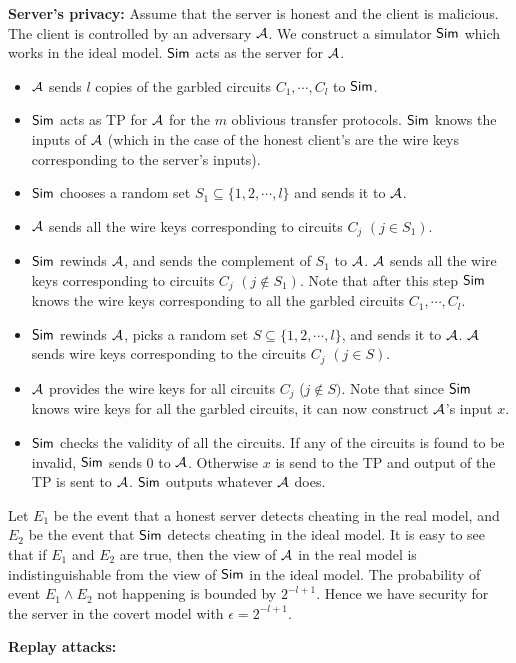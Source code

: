 \documentclass[12pt]{article}
\begin{document}
\noindent
{\bf Server's privacy:} Assume that the server is honest and the
client is malicious. The client is controlled by an
adversary ${\cal A}$. We construct a simulator ${\sf Sim}$ which works
in the ideal model. ${\sf Sim}$ acts as the server for ${\cal A}$.
\begin{itemize}
\item ${\cal A}$ sends $l$ copies of the garbled circuits $C_1,\cdots,C_l$ to ${\sf Sim}$.
\item ${\sf Sim}$ acts as TP for ${\cal A}$ for the $m$ oblivious transfer protocols. ${\sf Sim}$ knows the
inputs of ${\cal A}$ (which in the case of the honest client's are the wire keys corresponding to the 
server's inputs).
\item ${\sf Sim}$ chooses a random set $S_1 \subseteq \{ 1,2, \cdots, l \}$ and sends it to ${\cal A}$.

\item ${\cal A}$ sends all the wire keys corresponding to circuits $C_j$ $(j \in S_1)$.

\item ${\sf Sim}$ rewinds ${\cal A}$, and sends the complement of $S_1$ to ${\cal A}$. 
${\cal A}$ sends all the wire keys corresponding to circuits $C_j$ $(j \not\in S_1)$. Note that after this
step ${\sf Sim}$ knows the wire keys corresponding to all the garbled circuits $C_1,\cdots,C_l$.

\item ${\sf Sim}$ rewinds ${\cal A}$, picks a random set $S \subseteq \{ 1,2,\cdots, l \}$, and
sends it to ${\cal A}$. ${\cal A}$ sends wire keys corresponding to the circuits $C_j$ $(j \in S)$. 

\item ${\cal A}$ provides the wire keys for all circuits $C_j$ ($j \not\in S)$. Note that since ${\sf Sim}$
knows wire keys for all the garbled circuits, it can now construct ${\cal A}$'s input $x$.

\item ${\sf Sim}$ checks the validity of all the circuits. If any of the circuits is found to be invalid,
${\sf Sim}$ sends $0$ to ${\cal A}$. Otherwise $x$ is send to the TP and output of the TP is sent to
${\cal A}$. ${\sf Sim}$ outputs whatever ${\cal A}$ does.
\end{itemize}
Let $E_1$ be the event that a honest server detects cheating in the real
model, and $E_2$ be the event that ${\sf Sim}$ detects cheating in the
ideal model. It is easy to see that if $E_1$ and $E_2$ are true, then
the view of ${\cal A}$ in the real model is indistinguishable from the
view of ${\sf Sim}$ in the ideal model. The probability of event $E_1
\wedge E_2$ not happening is bounded by $2^{-l+1}$. Hence we have
security for the server in the covert model with $\epsilon =
2^{-l+1}$.

\noindent
{\bf Replay attacks:}
\end{document}
